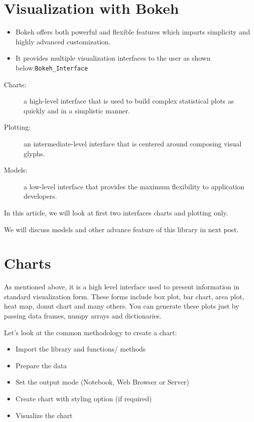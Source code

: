 \documentclass[a4paper,12pt]{article}
\begin{document}
	\large

 

\section{Visualization with Bokeh}
\begin{itemize}
\item Bokeh offers both powerful and flexible features which imparts simplicity and highly advanced customization. 



\item It provides multiple visualization interfaces to the user as shown below:\texttt{Bokeh\_Interface}
\end{itemize}



\begin{description}
\item[Charts:] a high-level interface that is used to build complex statistical plots as quickly and in a simplistic manner.
\item[Plotting:] an intermediate-level interface that is centered around composing visual glyphs.
\item[Models:] a low-level interface that provides the maximum flexibility to application developers.
\end{description}
In this article, we will look at first two interfaces charts and plotting only. 

We will discuss models and other advance feature of this library in next post.


\newpage

\section{Charts}

As mentioned above, it is a high level interface used to present information in standard visualization form. 
These forms include box plot, bar chart, area plot, heat map, donut chart and many others. You can generate these plots just by passing data frames, numpy arrays and dictionaries.

Let’s look at the common methodology to create a chart:

\begin{itemize}
\item Import the library and functions/ methods
\item Prepare the data
\item Set the output mode (Notebook, Web Browser or Server)
\item Create chart with styling option (if required)
\item Visualize the chart
\end{itemize}
\end{document}

